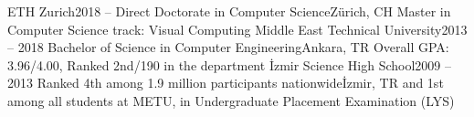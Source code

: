 \documentclass[main.tex]{subfiles}
\begin{document}
\olb
\olibig
{ETH Zurich}{2018 – }
{Direct Doctorate in Computer Science}{Zürich, CH}
{Master in Computer Science track: Visual Computing}
\olibig
{Middle East Technical University}{2013 – 2018}
{Bachelor of Science in Computer Engineering}{Ankara, TR}
{Overall GPA: 3.96/4.00, Ranked 2nd/190 in the department}
\olibig
{İzmir Science High School}{2009 – 2013}
{Ranked 4th among 1.9 million participants nationwide}{İzmir, TR}
{and 1st among all students at METU, in Undergraduate Placement Examination (LYS)}
\ole
\end{document}
